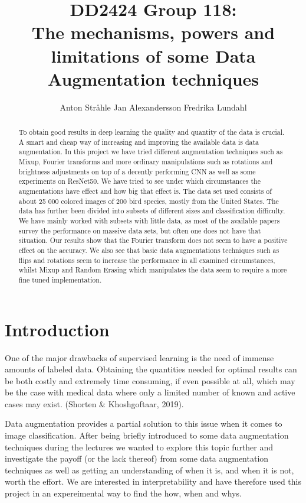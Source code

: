 \documentclass{article}
\title{DD2424 Group 118: \\ The mechanisms, powers and limitations of some Data Augmentation techniques}
\author{%
  Anton Stråhle \And Jan Alexandersson \And Fredrika Lundahl}
\begin{document}
	
\maketitle

\begin{abstract}

To obtain good results in deep learning the quality and quantity of the data is crucial. A smart and cheap way of increasing and 
improving the available data is data augmentation. In this project we have tried different 
augmentation techniques such as Mixup, Fourier transforms and more ordinary manipulations 
such as rotations and brightness adjustments on top of a decently performing CNN as well as some experiments on 
ResNet50. We have tried to see under which circumstances the augmentations have effect and how big that 
effect is. The data set used consists of about 25 000 colored images of 200 bird species, mostly from the United States. 
The data has further been divided into subsets of different sizes and classification difficulty. We have mainly worked with subsets with little data, as most of the available papers survey the performance on massive data sets, but often one does not have that situation.
Our results show that the 
Fourier transform does not seem to have a positive effect on the accuracy. 
We also see that basic data augmentations techniques such as flips and rotations seem to increase the performance in all examined circumstances, whilst Mixup and Random Erasing which manipulates the data seem to require a more fine tuned implementation.


\end{abstract}

\section{Introduction}

% 

One of the major drawbacks of supervised learning is the need of immense amounts of labeled data. Obtaining the quantities needed for optimal results can be both costly and extremely time consuming, if even possible at all, which may be the case with medical data where only a limited number of known and active cases may exist.  (Shorten \& Khoshgoftaar, 2019). 

Data augmentation provides a partial solution to this issue when it comes to image classification. After being briefly introduced to some data augmentation techniques during the lectures we wanted to explore this topic further and investigate the payoff (or the lack thereof) from some data augmentation techniques as well as getting an understanding of when it is, and when it is not, worth the effort. We are interested in interpretability and have therefore used this project in an expereimental way to find the how, when and whys. 
\end{document}
